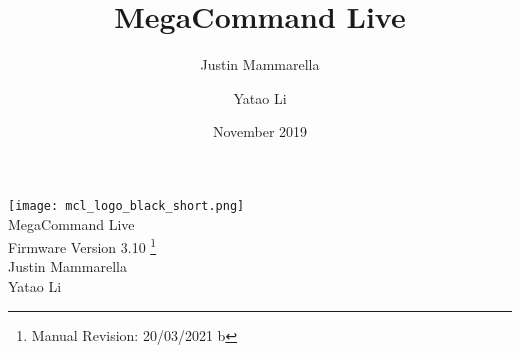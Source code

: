 \documentclass[openany,a4paper,12pt]{memoir}
\begin{document}
\author{
    Justin Mammarella
    \and
    Yatao Li
}
\title{MegaCommand Live}
\date{November 2019}

\frontmatter

	\begin{center}
	\vspace*{5.75cm}
	\texttt{[image: mcl\_logo\_black\_short.png]}
    \vspace*{1.00cm}
	\LARGE
	\vspace*{0.65cm}
	\\MegaCommand Live
    \large
	\\Firmware Version 3.10
	\footnote{Manual Revision: 20/03/2021 b}
    \vspace*{2cm}
    \\Justin Mammarella
    \\Yatao Li
\end{center}

\newpage
\mainmatter
\tableofcontents













%























\backmatter
\end{document}
